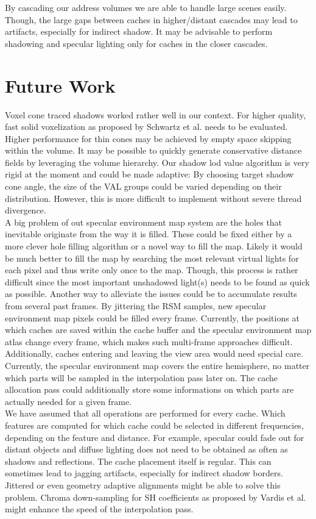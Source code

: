\documentclass[thesis.tex]{subfiles}
\begin{document}
By cascading our address volumes we are able to handle large scenes easily.
Though, the large gaps between caches in higher/distant cascades may lead to artifacts, especially for indirect shadow.
It may be advisable to perform shadowing and specular lighting only for caches in the closer cascades.



\section{Future Work}
Voxel cone traced shadows worked rather well in our context.
For higher quality, fast solid voxelization as proposed by Schwartz et al. \cite{bib:solidvoxelization} needs to be evaluated.
Higher performance for thin cones may be achieved by empty space skipping within the volume.
It may be possible to quickly generate conservative distance fields by leveraging the volume hierarchy.
%
Our shadow lod value algorithm is very rigid at the moment and could be made adaptive:
By choosing target shadow cone angle, the size of the VAL groups could be varied depending on their distribution.
However, this is more difficult to implement without severe thread divergence.
%
\\
A big problem of out specular environment map system are the holes that inevitable originate from the way it is filled.
These could be fixed either by a more clever hole filling algorithm or a novel way to fill the map.
Likely it would be much better to fill the map by searching the most relevant virtual lights for each pixel and thus write only once to the map.
Though, this process is rather difficult since the most important unshadowed light(s) needs to be found as quick as possible.
%
Another way to alleviate the issues could be to accumulate results from several past frames.
By jittering the RSM samples, new specular environment map pixels could be filled every frame.
Currently, the positions at which caches are saved within the cache buffer and the specular environment map atlas change every frame, which makes such multi-frame approaches difficult.
Additionally, caches entering and leaving the view area would need special care.
%
Currently, the specular environment map covers the entire hemisphere, no matter which parts will be sampled in the interpolation pass later on.
The cache allocation pass could additionally store some informations on which parts are actually needed for a given frame.
\\
We have assumed that all operations are performed for every cache.
Which features are computed for which cache could be selected in different frequencies, depending on the feature and distance.
For example, specular could fade out for distant objects and diffuse lighting does not need to be obtained as often as shadows and reflections.
%
The cache placement itself is regular.
This can sometimes lead to jagging artifacts, especially for indirect shadow borders.
Jittered or even geometry adaptive alignments might be able to solve this problem.
%
Chroma down-sampling for SH coefficients as proposed by Vardis et al. \cite{bib:radiancecachechromaticcompression} might enhance the speed of the interpolation pass.
\end{document}
